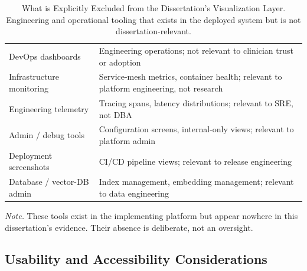 {\tablestripes\tablefontsize
{}
\begin{xltabular}{\textwidth}{@{} >{\raggedright\arraybackslash}p{3.0cm} L @{}}
\caption[Excluded from the Visualization Layer]{What is Explicitly Excluded from the Dissertation's Visualization Layer. Engineering and operational tooling that exists in the deployed system but is not dissertation-relevant.}\label{tab:dash_excluded} \\
\toprule
{} &  \\
\midrule
\endfirsthead
\endhead
\bottomrule
\endlastfoot
DevOps dashboards         & Engineering operations; not relevant to clinician trust or adoption \\
Infrastructure monitoring & Service-mesh metrics, container health; relevant to platform engineering, not research \\
Engineering telemetry     & Tracing spans, latency distributions; relevant to SRE, not DBA \\
Admin / debug tools       & Configuration screens, internal-only views; relevant to platform admin \\
Deployment screenshots    & CI/CD pipeline views; relevant to release engineering \\
Database / vector-DB admin & Index management, embedding management; relevant to data engineering \\
\end{xltabular}}
\vspace{0.4em}
\noindent\textit{Note.} These tools exist in the implementing platform but appear nowhere in this dissertation's evidence. Their absence is deliberate, not an oversight.

\subsection*{Usability and Accessibility Considerations}
\label{sec:dash_usability}

